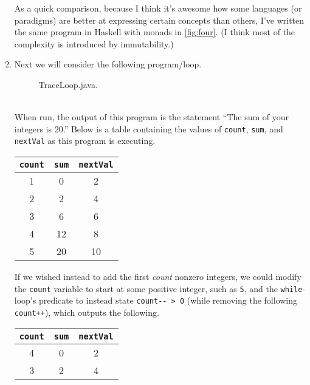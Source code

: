 \documentclass[leqno, 11pt]{article}
\begin{document}
\begin{enumerate}
        As a quick comparison, because I think it's awesome how some languages (or paradigms) are better at expressing certain concepts than others, I've written the same program in Haskell with monads in \autoref{fig:four}. (I think most of the complexity is introduced by immutability.)
  \item Next we will consider the following program/loop.
        \begin{figure}[h!]
          \centering
          
          \caption{TraceLoop.java.}
          \label{fig:five}
        \end{figure}\\
        When run, the output of this program is the statement ``The sum of your integers is 20.'' Below is a table containing the values of \texttt{count}, \texttt{sum}, and \texttt{nextVal} as this program is executing.
        \begin{center}
          \begin{tabular}{|c|c|c|}
            \hline
            \texttt{count} & \texttt{sum} & \texttt{nextVal}\\
            \hline
            1 & 0  & 2  \\
            \hline
            2 & 2  & 4  \\
            \hline
            3 & 6  & 6  \\
            \hline
            4 & 12 & 8  \\
            \hline
            5 & 20 & 10 \\
            \hline
          \end{tabular}
        \end{center}
        If we wished instead to add the first \textit{count} nonzero integers, we could modify the \texttt{count} variable to start at some positive integer, such as \texttt{5}, and the \texttt{while}-loop's predicate to instead state \verb|count-- > 0| (while removing the following  \texttt{count++}), which outputs the following.
        \begin{center}
          \begin{tabular}{|c|c|c|}
            \hline
            \texttt{count} & \texttt{sum} & \texttt{nextVal}\\
            \hline
             4 & 0  & 2  \\
            \hline
             3 & 2  & 4  \\

\end{tabular}
\end{center}
\end{enumerate}
\end{document}
